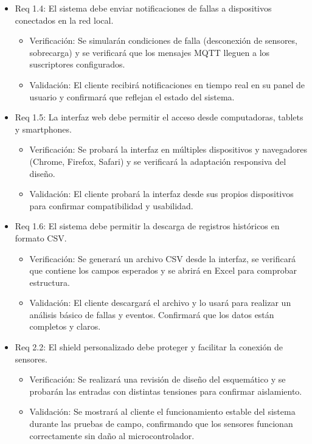 \documentclass[
11pt, %
]{charter}
\begin{document}
\begin{itemize}
\item Req 1.4: El sistema debe enviar notificaciones de fallas a dispositivos conectados en la red local.
\begin{itemize}
	\item Verificación: Se simularán condiciones de falla (desconexión de sensores, sobrecarga) y se verificará que los mensajes MQTT lleguen a los suscriptores configurados.

	\item Validación: El cliente recibirá notificaciones en tiempo real en su panel de usuario y confirmará que reflejan el estado del sistema.
\end{itemize}

\item Req 1.5: La interfaz web debe permitir el acceso desde computadoras, tablets y smartphones.
\begin{itemize}
	\item Verificación: Se probará la interfaz en múltiples dispositivos y navegadores (Chrome, Firefox, Safari) y se verificará la adaptación responsiva del diseño.
	
	\item Validación: El cliente probará la interfaz desde sus propios dispositivos para confirmar compatibilidad y usabilidad.
\end{itemize}

\item Req 1.6: El sistema debe permitir la descarga de registros históricos en formato CSV.
\begin{itemize}
	\item Verificación: Se generará un archivo CSV desde la interfaz, se verificará que contiene los campos esperados y se abrirá en Excel para comprobar estructura.

	\item Validación: El cliente descargará el archivo y lo usará para realizar un análisis básico de fallas y eventos. Confirmará que los datos están completos y claros.
\end{itemize}
\item Req 2.2: El shield personalizado debe proteger y facilitar la conexión de sensores.
\begin{itemize}
	\item Verificación: Se realizará una revisión de diseño del esquemático y se probarán las entradas con distintas tensiones para confirmar aislamiento.

	\item Validación: Se mostrará al cliente el funcionamiento estable del sistema durante las pruebas de campo, confirmando que los sensores funcionan correctamente sin daño al microcontrolador.
\end{itemize}


\end{itemize}
\end{document}
